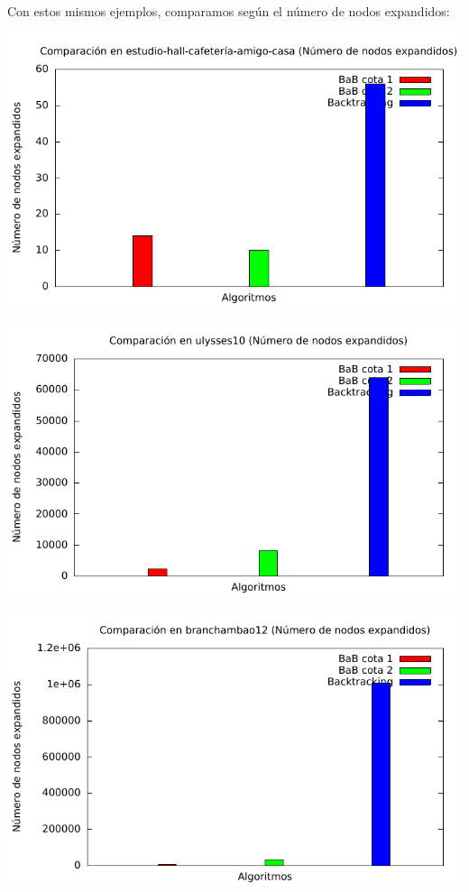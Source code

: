 Con estos mismos ejemplos, comparamos según el número de nodos expandidos:

\includegraphics[width=15cm]{img/barras_e-h-c-a-c5_nodos}

\includegraphics[width=15cm]{img/barras_ulysses10_nodos}

\includegraphics[width=15cm]{img/barras_branchambao12_nodos}

